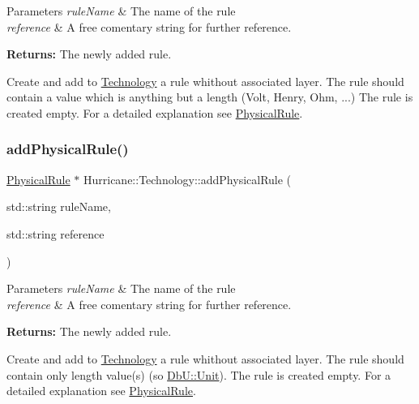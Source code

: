 \begin{DoxyParams}{Parameters}
{\em rule\+Name} & The name of the rule \\
\hline
{\em reference} & A free comentary string for further reference.\\
\hline
\end{DoxyParams}
{\bfseries Returns\+:} The newly added rule.

Create and add to \mbox{\hyperlink{classHurricane_1_1Technology}{Technology}} a rule whithout associated layer. The rule should contain a value which is anything but a length (Volt, Henry, Ohm, ...) The rule is created empty. For a detailed explanation see \mbox{\hyperlink{classHurricane_1_1PhysicalRule}{Physical\+Rule}}. \mbox{\label{classHurricane_1_1Technology_a267e44b205b97ff46297d16ed278a5bc}} 
\subsubsection{\texorpdfstring{add\+Physical\+Rule()}{addPhysicalRule()}\hspace{0.1cm}{\footnotesize\ttfamily [1/3]}}
{\footnotesize\ttfamily \mbox{\hyperlink{classHurricane_1_1PhysicalRule}{Physical\+Rule}} $\ast$ Hurricane\+::\+Technology\+::add\+Physical\+Rule (\begin{DoxyParamCaption}\item[{std\+::string}]{rule\+Name,  }\item[{std\+::string}]{reference }\end{DoxyParamCaption})}


\begin{DoxyParams}{Parameters}
{\em rule\+Name} & The name of the rule \\
\hline
{\em reference} & A free comentary string for further reference.\\
\hline
\end{DoxyParams}
{\bfseries Returns\+:} The newly added rule.

Create and add to \mbox{\hyperlink{classHurricane_1_1Technology}{Technology}} a rule whithout associated layer. The rule should contain only length value(s) (so \mbox{\hyperlink{group__DbUGroup_ga4fbfa3e8c89347af76c9628ea06c4146}{Db\+U\+::\+Unit}}). The rule is created empty. For a detailed explanation see \mbox{\hyperlink{classHurricane_1_1PhysicalRule}{Physical\+Rule}}. \mbox{\label{classHurricane_1_1Technology_a4210936e097a774035bf52bce7d962bc}} 
